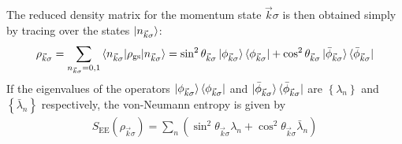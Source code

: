 \documentclass[reprint,hidelinks]{revtex4-2}
\begin{document}
The reduced density matrix for the momentum state \(\vec k\sigma\) is then obtained simply by tracing over the states \(\ket{n_{\vec k\sigma}}\):
\begin{equation}\begin{aligned}
	\rho_{\vec k\sigma} = \sum_{n_{\vec k\sigma}=0,1} \braket{n_{\vec k\sigma} | \rho_\text{gs} | n_{\vec k\sigma}} = \sin^2\theta_{\vec k\sigma} \ket{\phi_{\vec k\sigma}}\bra{\phi_{\vec k\sigma}} + \cos^2\theta_{\vec k\sigma} \ket{\bar\phi_{\vec k\sigma}}\bra{\bar\phi_{\vec k\sigma}}\label{red_matrix}
\end{aligned}\end{equation}
If the eigenvalues of the operators \(\ket{\phi_{\vec k\sigma}}\bra{\phi_{\vec k\sigma}}\) and \(\ket{\bar\phi_{\vec k\sigma}}\bra{\bar\phi_{\vec k\sigma}}\) are \(\left\{ \lambda_n \right\} \) and \(\left\{ \bar\lambda_n \right\} \) respectively, the von-Neumann entropy is given by
\begin{equation}\begin{aligned}
	S_\text{EE}\left(\rho_{\vec k\sigma}\right) = \sum_n \left( \sin^2\theta_{\vec k\sigma}\lambda_n + \cos^2\theta_{\vec k\sigma}\bar\lambda_n \right) 
\end{aligned}\end{equation}
\end{document}
